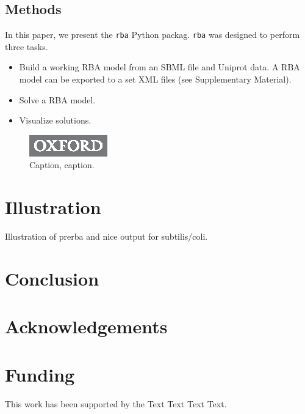 \documentclass{bioinfo}
\begin{document}
\begin{methods}
\section{Methods}

In this paper, we present the \texttt{rba} Python packag.
\texttt{rba} was designed to perform three tasks.
\begin{itemize}
  \item Build a working RBA model from an SBML file and Uniprot data.
  A RBA model can be exported to a set XML files (see Supplementary Material).
  \item Solve a RBA model.
  \item Visualize solutions.
\end{itemize}

\end{methods}

\begin{figure}[!tpb]%
\centerline{\includegraphics{OUP_First_SBk_Bot_8401.eps}}
\caption{Caption, caption.}\label{fig:01}
\end{figure}

\section{Illustration}

Illustration of prerba and nice output for subtilis/coli.

\section{Conclusion}

\section*{Acknowledgements}

\section*{Funding}

This work has been supported by the Text Text  Text Text.\vspace*{-12pt}


%
%
%
%
%
%
%

\end{document}
